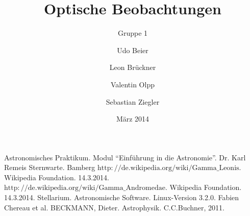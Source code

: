 
%
%


\title{Optische Beobachtungen}
\subtitle{Gruppe 1}
\date{März 2014}
\author{Udo Beier \and Leon Brückner \and Valentin Olpp \and Sebastian Ziegler}

\maketitle
\tableofcontents
\listoffigures
\newpage







%
\newpage

%


\begin{thebibliography}{9}
 Astronomisches Praktikum. Modul \enquote{Einführung in die Astronomie}. Dr. Karl Remeis Sternwarte. Bamberg
 $\mathrm{http://de.wikipedia.org/wiki/Gamma\_Leonis.}$ Wikipedia Foundation. 14.3.2014.
 $\mathrm{http://de.wikipedia.org/wiki/Gamma\_Andromedae}$. Wikipedia Foundation. 14.3.2014.
 Stellarium. Astronomische Software. Linux-Version 3.2.0. Fabien Chereau et al.
 BECKMANN, Dieter. Astrophysik. C.C.Buchner, 2011.
\end{thebibliography}



